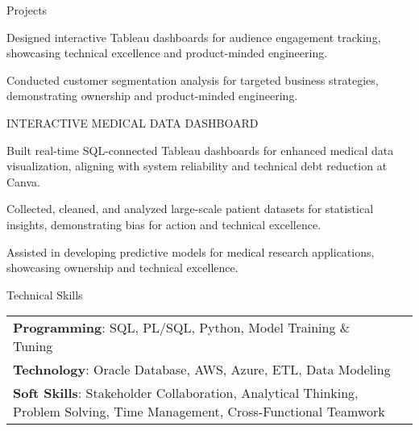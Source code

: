 \documentclass{resume} %
\begin{document}
\begin{rSection}{Projects}
\begin{rSubsection}
                                    \item Designed interactive Tableau dashboards for audience engagement tracking, showcasing technical excellence and product{-}minded engineering.
                                    \item Conducted customer segmentation analysis for targeted business strategies, demonstrating ownership and product{-}minded engineering.
                            \end{rSubsection}
                    \begin{rSubsection}
                                    {INTERACTIVE MEDICAL DATA DASHBOARD}
                                {}{}{}
                                    \item Built real{-}time SQL{-}connected Tableau dashboards for enhanced medical data visualization, aligning with system reliability and technical debt reduction at Canva.
                                    \item Collected, cleaned, and analyzed large{-}scale patient datasets for statistical insights, demonstrating bias for action and technical excellence.
                                    \item Assisted in developing predictive models for medical research applications, showcasing ownership and technical excellence.
                            \end{rSubsection}
            \end{rSection}

    \begin{rSection}{Technical Skills}
        \begin{tabular}{ @{} l @{	} l }
                                \textbf{Programming}: SQL, PL/SQL, Python, Model Training \& Tuning\\
                                \textbf{Technology}: Oracle Database, AWS, Azure, ETL, Data Modeling\\
                                \textbf{Soft Skills}: Stakeholder Collaboration, Analytical Thinking, Problem Solving, Time Management, Cross{-}Functional Teamwork\\
        \end{tabular}
    \end{rSection}
\end{document}
